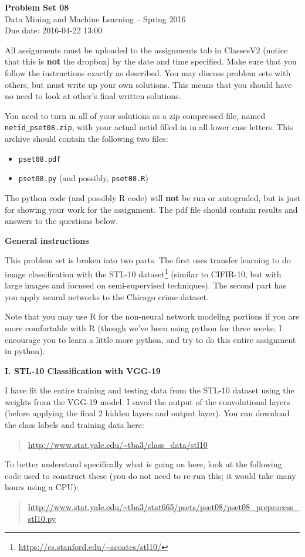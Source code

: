 \documentclass[12pt]{article}
\begin{document}
\begin{center}
{\bf Problem Set 08} \\
Data Mining and Machine Learning -- Spring 2016 \\
Due date: 2016-04-22 13:00
\end{center}

\medskip

All assignments must be uploaded to the assignments tab in ClassesV2
(notice that this is \textbf{not} the dropbox) by the date and time specified.
Make sure that you follow the instructions exactly as described.
You may discuss problem sets with others, but must write up your own
solutions. This means that you should have no need to look at other's
final written solutions.

You need to turn in all of your solutions as a zip compressed file, named
\texttt{netid\_pset08.zip}, with your actual netid filled in in all lower
case letters. This archive should contain the following two files:
\begin{itemize}
\item \texttt{pset08.pdf}
\item \texttt{pset08.py} (and possibly, \texttt{pset08.R})
\end{itemize}
The python code (and possibly R code) will \textbf{not} be run or autograded,
but is just for showing your work for the assignment. The pdf file should
contain results and answers to the questions below.

\medskip

\textbf{General instructions}

This problem set is broken into two parts. The first uses transfer
learning to do image classification with the STL-10
dataset\footnote{\url{https://cs.stanford.edu/~acoates/stl10/}} (similar
to CIFIR-10, but with large images and focused on semi-supervised
techniques). The second part has you apply neural networks to the
Chicago crime dataset.

Note that you may use R for the non-neural network modeling portions
if you are more comfortable with R (though we've been using python
for three weeks; I encourage you to learn a little more python, and
try to do this entire assignment in python).

\textbf{I. STL-10 Classification with VGG-19}

I have fit the entire training and testing data from the STL-10 dataset
using the weights from the VGG-19 model. I saved the output of the
convolutional layers (before applying the final 2 hidden layers and
output layer). You can download the class labels and training data
here:
\begin{quote}
\url{http://www.stat.yale.edu/~tba3/class_data/stl10}
\end{quote}
To better understand specifically what is going on here, look at the
following code used to construct these (you do not need to re-run this;
it would take many hours using a CPU):
\begin{quote}
\url{http://www.stat.yale.edu/~tba3/stat665/psets/pset08/pset08_preprocess_stl10.py}
\end{quote}
\end{document}

